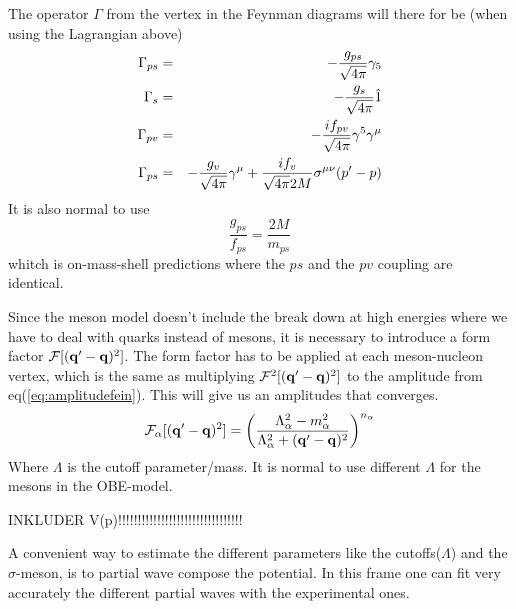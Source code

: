 The operator $\Gamma$ from the vertex in the Feynman diagrams will there for be (when using the Lagrangian above)
\begin{eqnarray}\label{eq:Gamma-ps}
\Gamma_{ps}&=&-\frac{g_{ps}}{\sqrt{4\pi}}\gamma_5\\
\Gamma_{s}&=&-\frac{g_{s}}{\sqrt{4\pi}}\op{1}\\
\label{eq:Gamma-pv}
\Gamma_{pv}&=&-\frac{if_{pv}}{\sqrt{4\pi}}\gamma^5\gamma^\mu\\
\label{eq:Gamma-v}
\Gamma_{ps}&=&-\frac{g_{v}}{\sqrt{4\pi}}\gamma^\mu+\frac{if_{v}}{\sqrt{4\pi}2M}\sigma^{\mu\nu}(p'-p)
\end{eqnarray}
It is also normal to use
\begin{equation}
\frac{g_{ps}}{f_{ps}}=\frac{2M}{m_{ps}}
\end{equation}
whitch is on-mass-shell predictions where the $ps$ and the $pv$ coupling are identical.

Since the meson model doesn't include the break down at high energies where we have to deal with quarks instead of
mesons, it is necessary to introduce a form factor ${\cal F}[({{\bf q}}'-{{\bf q}})^2]$. The form factor has to be applied at each meson-nucleon vertex,
which is the same as multiplying ${\cal F}^2[({{\bf q}}'-{{\bf q}})^2]$ to the amplitude from eq(\ref{eq:amplitudefein}). This will
give us an amplitudes that converges.
\begin{equation}\label{eq:formfactor}
{\cal F}_\alpha[({{\bf q}}'-{{\bf q}})^2]=\bigg(\frac{\Lambda^2_\alpha-m^2_\alpha}{\Lambda^2_\alpha+
({{\bf q}}'-{{\bf q}})^2}\bigg)^{n_\alpha}
\end{equation}
Where $\Lambda$ is the cutoff parameter/mass. It is normal to use different $\Lambda$ for the mesons
in the OBE-model.

INKLUDER V(p)!!!!!!!!!!!!!!!!!!!!!!!!!!!!!!!!








A convenient way to  estimate the different parameters like the cutoffs($\Lambda$) and the $\sigma$-meson, 
is to partial wave compose the potential. In this frame one can fit very accurately the different partial waves 
with the experimental ones.

